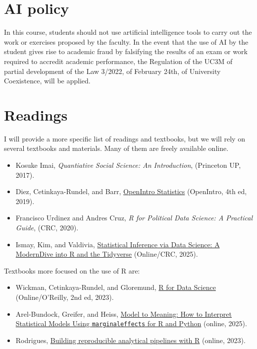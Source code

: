 \documentclass[12pt, a4paper]{article}
\begin{document}
\section{AI policy}

In this course, students should not use artificial intelligence tools to carry out the work or exercises proposed by the faculty. In the event that the use of AI by the student gives rise to academic fraud by falsifying the results of an exam or work required to accredit academic performance, the Regulation of the UC3M of partial development of the Law 3/2022, of February 24th, of University Coexistence, will be applied.

\section{Readings}

I will provide a more specific list of readings and textbooks, but we will rely on several textbooks and materials. Many of them are freely available online.

\begin{itemize}
\setlength\itemsep{-5pt}
  \item Kosuke Imai, \textit{Quantiative Social Science: An Introduction}, (Princeton UP, 2017).
  \item Diez, Cetinkaya-Rundel, and Barr, \href{https://www.openintro.org/book/os/}{OpenIntro Statistics} (OpenIntro, 4th ed, 2019).
  \item Francisco Urdinez and Andres Cruz, \textit{R for Political Data Science: A Practical Guide}, (CRC, 2020).
  \item Ismay, Kim, and Valdivia, \href{https://moderndive.com/}{Statistical Inference via Data Science: A ModernDive into R and the Tidyverse} (Online/CRC, 2025).
\end{itemize}


Textbooks more focused on the use of R are:

\begin{itemize}
\setlength\itemsep{-5pt}
  \item Wickman, Cetinkaya-Rundel, and Gloremund, \href{https://r4ds.hadley.nz/}{R for Data Science} (Online/O'Reilly, 2nd ed, 2023).
  \item Arel-Bundock, Greifer, and Heiss, \href{https://marginaleffects.com/chapters/who.html}{Model to Meaning: How to Interpret Statistical Models Using \texttt{marginaleffects} for R and Python} (online, 2025).
  \item Rodrigues, \href{https://raps-with-r.dev/}{Building reproducible analytical pipelines with R} (online, 2023).
\end{itemize}
\end{document}

